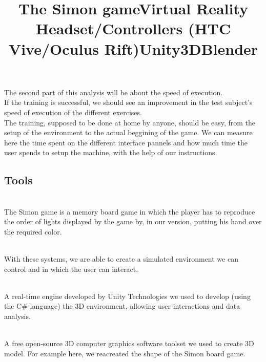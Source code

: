 \documentclass[12pt, openany, twocolumn]{article}
\begin{document}
                    
        \begin{figure}
            \caption{}
        \end{figure}

        
        \begin{figure}
            \caption{}
        \end{figure}

    The second part of this analysis will be about the speed of execution. \\
    If the training is successful, we should see an improvement in the test subject's speed of execution of the different exercises.
    \\


    The training, supposed to be done at home by anyone, should be easy, from the setup of the environment to the actual beggining of the game. 
    We can measure here the time spent on the different interface pannels and how much time the user spends to setup the machine, with the help of our instructions.

    \subsection{Tools}
        \title{\textbf{The Simon game}} \\
    The Simon game is a memory board game in which the player has to reproduce the order of lights displayed by the game by, in our version, putting his hand over the required color. \\

        \noindent \title{\textbf{Virtual Reality Headset/Controllers (HTC Vive/Oculus Rift)}} \\
    With these systems, we are able to create a simulated environment we can control and in which the user can interact. \\
    
        \noindent \title{\textbf{Unity3D}} \\
    A real-time engine developed by Unity Technologies we used to develop (using the C\# language) the 3D environment, allowing user interactions and data analysis. \\

        \noindent \title{\textbf{Blender}} \\
    A free open-source 3D computer graphics software toolset we used to create 3D model. For example here, we reacreated the shape of the Simon board game. \\   
        
\end{document}
